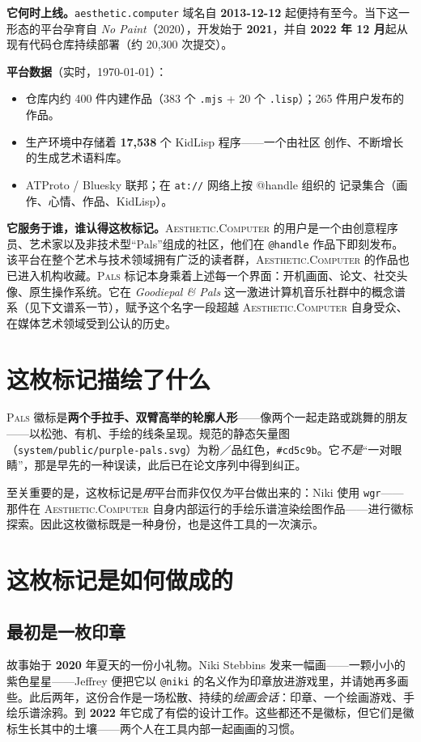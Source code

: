 \documentclass[10pt,letterpaper,twocolumn]{article}
\newcommand{\ac}{\textsc{Aesthetic}{\color{acpink}.}\textsc{Computer}}
\newcommand{\pals}{\textsc{Pals}}
\begin{document}
\textbf{它何时上线。}\texttt{aesthetic.computer} 域名自 \textbf{2013-12-12} 起便持有至今。当下这一形态的平台孕育自 \emph{No Paint}（2020），开发始于 \textbf{2021}，并自 \textbf{2022 年 12 月}起从现有代码仓库持续部署（约 20{,}300 次提交）。

\textbf{平台数据}（实时，\today）：
\begin{itemize}
  \item 仓库内约 400 件内建作品（383 个 \texttt{.mjs} + 20 个
        \texttt{.lisp}）；265 件用户发布的作品。
  \item 生产环境中存储着 \textbf{17{,}538} 个 KidLisp 程序——一个由社区
        创作、不断增长的生成艺术语料库。
  \item ATProto / Bluesky 联邦；在 \texttt{at://} 网络上按 @handle 组织的
        记录集合（画作、心情、作品、KidLisp）。
\end{itemize}

\textbf{它服务于谁，谁认得这枚标记。}\ac{} 的用户是一个由创意程序员、艺术家以及非技术型“Pals”组成的社区，他们在 \texttt{@handle} 作品下即刻发布。该平台在整个艺术与技术领域拥有广泛的读者群，\ac{} 的作品也已进入机构收藏。\pals{} 标记本身乘着上述每一个界面：开机画面、论文、社交头像、原生操作系统。它在 \emph{Goodiepal \& Pals} 这一激进计算机音乐社群中的概念谱系（见下文谱系一节），赋予这个名字一段超越 \ac{} 自身受众、在媒体艺术领域受到公认的历史。

\section{这枚标记描绘了什么}

\pals{} 徽标是\textbf{两个手拉手、双臂高举的轮廓人形}——像两个一起走路或跳舞的朋友——以松弛、有机、手绘的线条呈现。规范的静态矢量图（\texttt{system/public/purple-pals.svg}）为粉／品红色，\texttt{\#cd5c9b}。它\emph{不是}“一对眼睛”，那是早先的一种误读，此后已在论文序列中得到纠正。

至关重要的是，这枚标记是\emph{用}平台而非仅仅\emph{为}平台做出来的：Niki 使用 \texttt{wgr}——那件在 \ac{} 自身内部运行的手绘乐谱渲染绘图作品——进行徽标探索。因此这枚徽标既是一种身份，也是这件工具的一次演示。

\section{这枚标记是如何做成的}

\subsection{最初是一枚印章}
故事始于 \textbf{2020} 年夏天的一份小礼物。Niki Stebbins 发来一幅画——一颗小小的紫色星星——Jeffrey 便把它以 \texttt{@niki} 的名义作为印章放进游戏里，并请她再多画些。此后两年，这份合作是一场松散、持续的\emph{绘画会话}：印章、一个绘画游戏、手绘乐谱涂鸦。到 \textbf{2022} 年它成了有偿的设计工作。这些都还不是徽标，但它们是徽标生长其中的土壤——两个人在工具内部一起画画的习惯。
\end{document}
